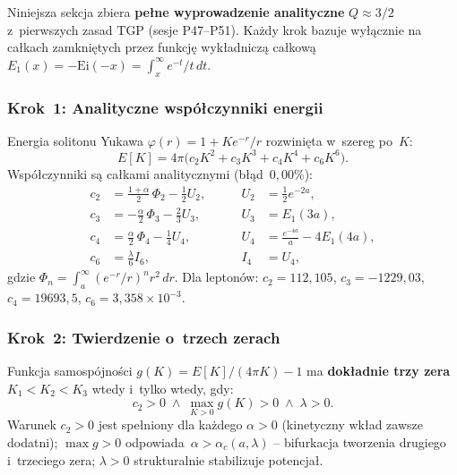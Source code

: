 Niniejsza sekcja zbiera \textbf{pe\l{}ne wyprowadzenie analityczne}
$Q\approx3/2$ z~pierwszych zasad TGP (sesje P47--P51).
Ka\.zdy krok bazuje wy\l{}\k{a}cznie na ca\l{}kach zamkni\k{e}tych
przez funkcj\k{e} wyk\l{}adnicz\k{a} ca\l{}kow\k{a}
$E_1(x)=-\mathrm{Ei}(-x)=\int_x^\infty e^{-t}/t\,dt$.

\subsubsection{Krok~1: Analityczne wsp\'o\l{}czynniki energii}%
\label{app:F-cn-Ei}

Energia solitonu Yukawa
$\varphi(r)=1+K e^{-r}/r$ rozwini\k{e}ta w~szereg po~$K$:
\begin{equation}\label{eq:EK-series}
  E[K] = 4\pi\bigl(c_2 K^2 + c_3 K^3 + c_4 K^4 + c_6 K^6\bigr).
\end{equation}
Wsp\'o\l{}czynniki s\k{a} ca\l{}kami analitycznymi (b\l{}\k{a}d~$0{,}00\%$):
\begin{equation}\label{eq:cn-analytic}
\begin{aligned}
  c_2 &= \tfrac{1+\alpha}{2}\,\Phi_2 - \tfrac{1}{2}U_2,&\qquad
  U_2 &= \tfrac{1}{2}e^{-2a},\\
  c_3 &= -\tfrac{\alpha}{2}\,\Phi_3 - \tfrac{2}{3}U_3,&\qquad
  U_3 &= E_1(3a),\\
  c_4 &= \tfrac{\alpha}{2}\,\Phi_4 - \tfrac{1}{4}U_4,&\qquad
  U_4 &= \tfrac{e^{-4a}}{a} - 4E_1(4a),\\
  c_6 &= \tfrac{\lambda}{6}I_6,&\qquad
  I_4 &= U_4,
\end{aligned}
\end{equation}
gdzie $\Phi_n=\int_a^\infty (e^{-r}/r)^n r^2\,dr$.
Dla leptonów: $c_2=112{,}105$, $c_3=-1229{,}03$,
$c_4=19693{,}5$, $c_6=3{,}358\!\times\!10^{-3}$.

\subsubsection{Krok~2: Twierdzenie o~trzech zerach}%
\label{app:F-three-zeros}

Funkcja samospójno\'sci $g(K)=E[K]/(4\pi K)-1$ ma
\textbf{dok\l{}adnie trzy zera} $K_1<K_2<K_3$ wtedy i~tylko wtedy, gdy:
\begin{equation}\label{eq:three-zeros}
  c_2>0
  \;\wedge\;
  \max_{K>0}g(K)>0
  \;\wedge\;
  \lambda>0.
\end{equation}
Warunek $c_2>0$ jest spe\l{}niony dla ka\.zdego $\alpha>0$
(kinetyczny wk\l{}ad zawsze dodatni);
$\max g>0$ odpowiada~$\alpha>\alpha_c(a,\lambda)$ -- bifurkacja tworzenia
drugiego i~trzeciego zera; $\lambda>0$ strukturalnie stabilizuje potencja\l{}.

